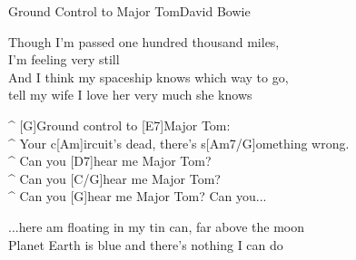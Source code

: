 \begin{song}{Ground Control to Major Tom}{David Bowie}
\medskip
{}
\begin{guitar}
Though I'm passed one hundred thousand miles,\\
I'm feeling very still\\
And I think my spaceship knows which way to go, \\
tell my wife I love her very much she knows\\
\end{guitar}

\medskip
{}
\begin{guitar}
^ [G]Ground control to [E7]Major Tom: \\
^ Your c[Am]ircuit's dead, there's s[Am7/G]omething wrong.\\
^ Can you [D7]hear me Major Tom? \\
^ Can you [C/G]hear me Major Tom? \\
^ Can you [G]hear me Major Tom? Can you...\\
\end{guitar}

\medskip
{}
\begin{guitar}
...here am floating in my tin can, far above the moon\\
Planet Earth is blue and there's nothing I can do\\
\end{guitar}

\medskip
{}
\end{song}
